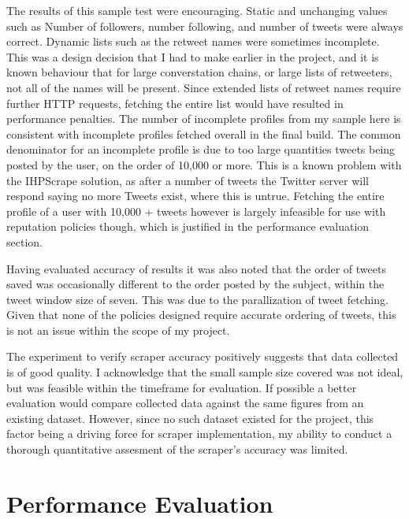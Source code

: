 The results of this sample test were encouraging. Static and unchanging values such as Number of followers, number following, and number of tweets were always correct. Dynamic lists such as the retweet names were sometimes incomplete. This was a design decision that I had to make earlier in the project, and it is known behaviour that for large converstation chains, or large lists of retweeters, not all of the names will be present. Since extended lists of retweet names require further HTTP requests, fetching the entire list would have resulted in performance penalties. The number of incomplete profiles from my sample here is consistent with incomplete profiles fetched overall in the final build. The common denominator for an incomplete profile is due to too large quantities tweets being posted by the user, on the order of 10,000 or more. This is a known problem with the IHPScrape solution, as after a number of tweets the Twitter server will respond saying no more Tweets exist, where this is untrue.  Fetching the entire profile of a user with 10,000 + tweets however is largely infeasible for use with reputation policies though, which is justified in the performance evaluation section.

Having evaluated accuracy of results it was also noted that the order of tweets saved was occasionally different to the order posted by the subject, within the tweet window size of seven. This was due to the parallization of tweet fetching. Given that none of the policies designed require accurate ordering of tweets, this is not an issue within the scope of my project. 

The experiment to verify scraper accuracy positively suggests that data collected is of good quality. I acknowledge that the small sample size covered was not ideal, but was feasible within the timeframe for evaluation. If possible a better evaluation would compare collected data against the same figures from an existing dataset. However, since no such dataset existed for the project, this factor being a driving force for scraper implementation, my ability to conduct a thorough quantitative assesment of the scraper's accuracy was limited.

\section{Performance Evaluation}


